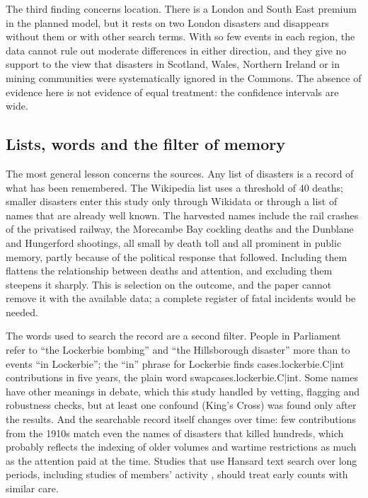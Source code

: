 \documentclass[11pt,a4paper]{article}
\begin{document}
The third finding concerns location. There is a London and South East premium in the planned model, but it rests on two London disasters and disappears without them or with other search terms. With so few events in each region, the data cannot rule out moderate differences in either direction, and they give no support to the view that disasters in Scotland, Wales, Northern Ireland or in mining communities were systematically ignored in the Commons. The absence of evidence here is not evidence of equal treatment: the confidence intervals are wide.

\subsection{Lists, words and the filter of memory}
The most general lesson concerns the sources. Any list of disasters is a record of what has been remembered. The Wikipedia list uses a threshold of 40 deaths; smaller disasters enter this study only through Wikidata or through a list of names that are already well known. The harvested names include the rail crashes of the privatised railway, the Morecambe Bay cockling deaths and the Dunblane and Hungerford shootings, all small by death toll and all prominent in public memory, partly because of the political response that followed. Including them flattens the relationship between deaths and attention, and excluding them steepens it sharply. This is selection on the outcome, and the paper cannot remove it with the available data; a complete register of fatal incidents would be needed.

The words used to search the record are a second filter. People in Parliament refer to ``the Lockerbie bombing'' and ``the Hillsborough disaster'' more than to events ``in Lockerbie''; the ``in'' phrase for Lockerbie finds {{cases.lockerbie.C|int}} contributions in five years, the plain word {{swapcases.lockerbie.C|int}}. Some names have other meanings in debate, which this study handled by vetting, flagging and robustness checks, but at least one confound (King's Cross) was found only after the results. And the searchable record itself changes over time: few contributions from the 1910s match even the names of disasters that killed hundreds, which probably reflects the indexing of older volumes and wartime restrictions as much as the attention paid at the time. Studies that use Hansard text search over long periods, including studies of members' activity \citep{EggersSpirling2014}, should treat early counts with similar care.
\end{document}
